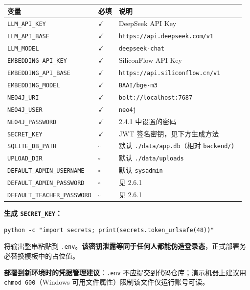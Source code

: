 \documentclass[UTF8,a4paper,11pt]{ctexrep}
\begin{document}
\begin{center}
\small
\begin{tabularx}{\linewidth}{@{}XXX@{}}
\toprule
变量 & 必填 & 说明 \\
\midrule
\texttt{LLM\_API\_KEY} & $\checkmark$ & DeepSeek API Key \\
\texttt{LLM\_API\_BASE} & $\checkmark$ & \texttt{https://api.deepseek.com/v1} \\
\texttt{LLM\_MODEL} & $\checkmark$ & \texttt{deepseek-chat} \\
\texttt{EMBEDDING\_API\_KEY} & $\checkmark$ & SiliconFlow API Key \\
\texttt{EMBEDDING\_API\_BASE} & $\checkmark$ & \texttt{https://api.siliconflow.cn/v1} \\
\texttt{EMBEDDING\_MODEL} & $\checkmark$ & \texttt{BAAI/bge-m3} \\
\texttt{NEO4J\_URI} & $\checkmark$ & \texttt{bolt://localhost:7687} \\
\texttt{NEO4J\_USER} & $\checkmark$ & \texttt{neo4j} \\
\texttt{NEO4J\_PASSWORD} & $\checkmark$ & 2.4.1 中设置的密码 \\
\texttt{SECRET\_KEY} & $\checkmark$ & JWT 签名密钥，见下方生成方法 \\
\texttt{SQLITE\_DB\_PATH} & $\square$ & 默认 \texttt{./data/app.db}（相对 \texttt{backend/}） \\
\texttt{UPLOAD\_DIR} & $\square$ & 默认 \texttt{./data/uploads} \\
\texttt{DEFAULT\_ADMIN\_USERNAME} & $\square$ & 默认 \texttt{sysadmin} \\
\texttt{DEFAULT\_ADMIN\_PASSWORD} & $\square$ & 见 2.6.1 \\
\texttt{DEFAULT\_TEACHER\_PASSWORD} & $\square$ & 见 2.6.1 \\
\bottomrule
\end{tabularx}
\end{center}
\textbf{生成 \texttt{SECRET\_KEY}：}

\begin{Verbatim}[breaklines=true,breakanywhere=true,fontsize=\small,frame=single,framesep=4pt,rulecolor=\color{codeframe}]
python -c "import secrets; print(secrets.token_urlsafe(48))"
\end{Verbatim}

将输出整串粘贴到 \texttt{.env}。\textbf{该密钥泄露等同于任何人都能伪造登录态}，正式部署务必替换模板中的占位值。

\begin{notebox}
\textbf{部署到新环境时的凭据管理建议}：\texttt{.env} 不应提交到代码仓库；演示机器上建议用 \texttt{chmod 600}（Windows 可用文件属性）限制该文件仅运行账号可读。

\end{notebox}
\end{document}
